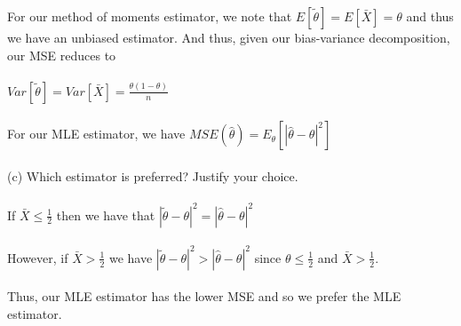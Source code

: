 \documentclass{article}
\begin{document}
For our method of moments estimator, we note that $E[\tilde{\theta}]=E[\bar{X}]=\theta$ and thus we have an unbiased estimator.  And thus, given our bias-variance decomposition, our MSE reduces to\\\\ $Var[\tilde{\theta}]=Var[\bar{X}]=\frac{\theta(1-\theta)}{n}$\\\\
For our MLE estimator, we have $MSE(\hat{\theta})=E_\theta[|\hat{\theta}-\theta|^2]$\\\\
(c) Which estimator is preferred?  Justify your choice.\\\\
If $\bar{X}\leq\frac{1}{2}$ then we have that $|\tilde{\theta}-\theta|^2=|\hat{\theta}-\theta|^2$\\\\
However, if $\bar{X}>\frac{1}{2}$ we have $|\tilde{\theta}-\theta|^2>|\hat{\theta}-\theta|^2$ since $\theta\leq\frac{1}{2}$ and $\bar{X}>\frac{1}{2}$.\\\\
Thus, our MLE estimator has the lower MSE and so we prefer the MLE estimator.
\pagebreak
\end{document}
